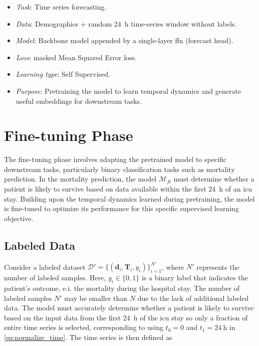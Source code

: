 \begin{itemize}
    \item \emph{Task}: Time series forecasting.
    \item \emph{Data}: Demographics + random \qty{24}{\hour} time-series window without labels.
    \item \emph{Model}: Backbone model appended by a single-layer \gls{ffn} (forecast head).
    \item \emph{Loss}: masked Mean Squared Error loss.
    \item \emph{Learning type}: Self Supervised.
    \item \emph{Purpose}: Pretraining the model to learn temporal dynamics and generate useful embeddings for downstream tasks.
\end{itemize}



\section{Fine-tuning Phase}
\label{sec:finetuning}

The fine-tuning phase involves adapting the pretrained model to specific downstream tasks, particularly binary classification tasks such as mortality prediction. In the mortality prediction, the model \( \mathcal{M}_{ft} \) must determine whether a patient is likely to survive based on data available within the first \qty{24}{\hour} of an \gls{icu} stay. Building upon the temporal dynamics learned during pretraining, the model is fine-tuned to optimize its performance for this specific supervised learning objective.

\subsection{Labeled Data}

Consider a labeled dataset \( \mathcal{D}' = \{(\mathbf{d}_i, \mathbf{T}_i, y_i)\}_{i=1}^{N'} \), where \(N'\) represents the number of labeled samples. Here, \( y_i \in \{0, 1\} \) is a binary label that indicates the patient's outcome, e.i. the mortality during the hospital stay. The number of labeled samples \( N' \) may be smaller than \( N \) due to the lack of additional labeled data. The model must accurately determine whether a patient is likely to survive based on the input data from the first \qty{24}{\hour} of the \gls{icu} stay so only a fraction of entire time series is selected, corresponding to using \( t_0 = 0 \) and \( t_1 = \qty{24}{\hour}\) in \cref{eq:normalize_time}. The time series is then defined as

